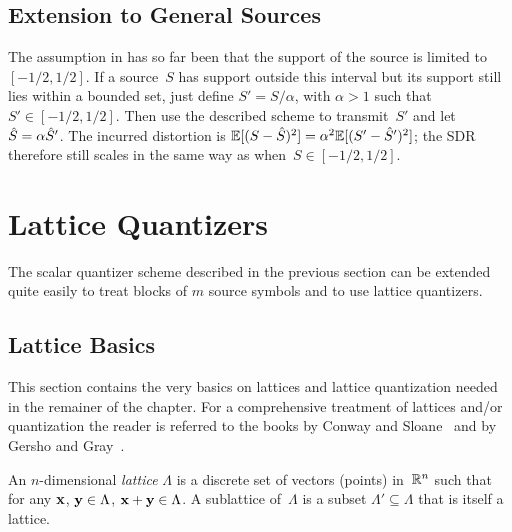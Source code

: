 


\subsection{Extension to General Sources}

The assumption in  has so far been that the support of the
source is limited to~$[-1/2,1/2]$. If a source~$S$ has support outside this
interval but its support still lies within a bounded set, just define $S' =
S/\alpha$, with $\alpha > 1$ such that $S' \in [-1/2, 1/2]$. Then use
the described scheme to transmit~$S'$ and let ${\hat{S}} = \alpha {\hat{S}}'$. The
incurred distortion is $\mathbb{E}[(S - {\hat{S}})^2] = \alpha^2 \mathbb{E}[(S' - {\hat{S}}')^2]$; the SDR
therefore still scales in the same way as when~$S \in [-1/2, 1/2]$.



\section{Lattice Quantizers}\label{sec:latticequant}

The scalar quantizer scheme described in the previous section can be extended
quite easily to treat blocks of $m$ source symbols and to use lattice
quantizers. 


\subsection{Lattice Basics}

This section contains the very basics on lattices and lattice quantization
needed in the remainer of the chapter. For a comprehensive treatment of lattices
and/or quantization the reader is referred to the books by Conway and
Sloane~\cite{ConwayS1988} and by Gersho and Gray~\cite{GershoG1992}.

\begin{definition}
  An $n$-dimensional \emph{lattice} $\Lambda$ is a discrete set of vectors
  (points) in~$\mathbb{R}^n$ such that for any $\mathbf{x}$, $\mathbf{y} \in \Lambda$, $\mathbf{x} + \mathbf{y} \in
  \Lambda$. A sublattice of~$\Lambda$ is a subset $\Lambda' \subseteq \Lambda$
  that is itself a lattice. 
\end{definition}


